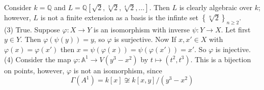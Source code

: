 \documentclass[a4paper]{article}
\begin{document}
      Consider $k = \mathbb{Q}$ and 
      $L = \mathbb{Q}\left[ \sqrt{2} , \sqrt[3]{2},
      \sqrt[4]{2}, \ldots \right] $. Then $L$ is clearly algebraic over
      $k$; however, $L$ is not a finite extension as a basis is
      the infinte set $\left\{ \sqrt[n]{2}  \right\}_{n \ge 2}$.\\
      \linebreak
      (3) True. Suppose $\varphi  \colon X \to Y$ is an isomorphism with
      inverse
      $\psi  \colon Y \to X$. Let first  $y \in Y$. Then
      $\varphi \left( \psi (y) \right) = y$, so
      $\varphi$ is surjective. Now
      If $x,x' \in X$ with $\varphi(x) = \varphi(x')$ then
      $x = \psi\left( \varphi(x) \right) = \psi(\varphi(x')) = x'$. So
      $\varphi$ is injective.\\
      \linebreak
      (4) Consider the map 
      $\varphi  \colon \mathbb{A}^{1} \to V\left( y^3 - x^2 \right) $ by
      $t \mapsto (t^2, t^3)$. This is a bijection on points, however, 
      $\varphi$ is not an isomorphism, since 
      \[
      \Gamma(A^{1}) = k\left[ x \right] \not \cong k\left[ x,y \right] /(y^3
      - x^2)
      \] 
      
\end{document}
